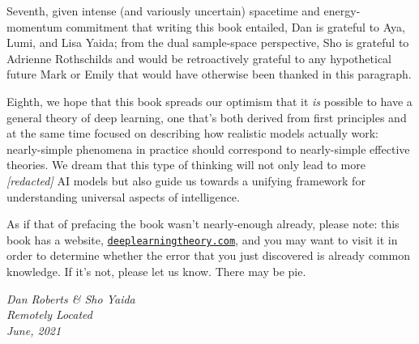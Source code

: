 Seventh, given intense
(and variously uncertain) 
spacetime and energy-momentum
commitment that writing this book entailed,
Dan is grateful to Aya, Lumi, and Lisa Yaida; from the dual sample-space perspective, Sho is grateful to Adrienne Rothschilds and would be
retroactively grateful to any
hypothetical future Mark or
Emily
that would have otherwise been thanked in this paragraph.


Eighth, %
we hope that this book spreads our
optimism that
it \emph{is} possible to have
a
general theory of deep learning, 
one that’s both derived from first principles and at the same time focused on describing 
how realistic models actually work: nearly-simple phenomena in practice should correspond to nearly-simple  effective theories.
We %
dream that
this type of thinking
will not only 
lead to  more
\emph{[redacted]} AI models
but also guide us towards a unifying framework for understanding universal aspects of intelligence.




As if that  of prefacing the book wasn't nearly-enough already, please note: 
this book has a website,
\href{https://deeplearningtheory.com}{\texttt{deeplearningtheory.com}},
and you may want to visit it in order to determine whether the error that you just discovered is already common knowledge. If it's not, please let us know.
There may be pie.\\


\hfill\begin{minipage}{0.29\linewidth}
\emph{Dan Roberts \& Sho Yaida}\\
\emph{Remotely Located}\\
\emph{June, 2021}
\end{minipage}








